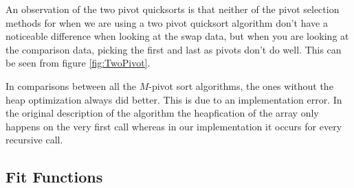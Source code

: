 		

		
		An observation of the two pivot quicksorts is that neither of the pivot selection methods for when we are using a two pivot quicksort algorithm don't have a noticeable difference when looking at the swap data, but when you are looking at the comparison data, picking the first and last as pivots don't do well. This can be seen from figure \ref{fig:TwoPivot}.
		
		
		

		In comparisons between all the $M$-pivot sort algorithms, the ones without the heap optimization always did better. This is due to an implementation error. In the original description of the algorithm the heapfication of the array only happens on the very first call whereas in our implementation it occurs for every recursive call.


	\subsection{Fit Functions}
		
